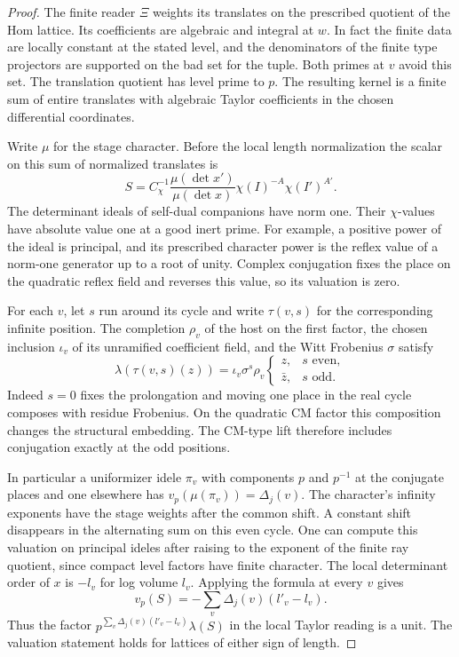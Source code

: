 \begin{proof}

The finite reader \(\Xi\) weights its translates on the prescribed
quotient of the Hom lattice. Its coefficients are algebraic and
integral at \(w\). In fact the finite data are locally constant at
the stated level, and the denominators of the finite type projectors
are supported on the bad set for the tuple. Both primes at \(v\)
avoid this set. The translation quotient has level prime to \(p\).
The resulting kernel is a finite sum of entire translates with
algebraic Taylor coefficients in the chosen differential coordinates.

Write \(\mu\) for the stage character. Before the local length
normalization the scalar on this sum of normalized translates is
\[
 S=C_\chi^{-1}\frac{\mu(\det x')}{\mu(\det x)}
                  \chi(I)^{-A}\chi(I')^{A'} .
 \tag{I1}\label{eq:tag-i1}
\]
The determinant ideals of self-dual companions have norm one.
Their \(\chi\)-values have absolute value one at a good inert
prime. For example, a positive power of the ideal is principal,
and its prescribed character power is the reflex value of a
norm-one generator up to a root of unity. Complex conjugation
fixes the place on the quadratic reflex field and reverses this
value, so its valuation is zero.


For each \(v\), let \(s\) run around its cycle and write
\(\tau(v,s)\) for the corresponding infinite position. The
completion \(\rho_v\) of the host on the first factor, the
chosen inclusion \(\iota_v\) of its unramified coefficient field,
and the Witt Frobenius \(\sigma\) satisfy
\[
 \lambda(\tau(v,s)(z))=
 \iota_v\sigma^s\rho_v
 \begin{cases} z,&s\text{ even},\\ \bar z,&s\text{ odd}.
 \end{cases}
 \tag{I2}\label{eq:tag-i2}
\]
Indeed \(s=0\) fixes the prolongation and moving one place in
the real cycle composes with residue Frobenius. On the quadratic
CM factor this composition changes the structural embedding.
The CM-type lift therefore includes conjugation exactly at the
odd positions.

In particular a uniformizer idele \(\pi_v\) with
components \(p\) and \(p^{-1}\) at the conjugate places and one
elsewhere has \(v_p(\mu(\pi_v))=\Delta_j(v)\). The character's
infinity exponents have the stage weights after the common shift.
A constant shift disappears in the alternating sum on this even
cycle. One can compute this valuation on principal ideles after
raising to the exponent of the finite ray quotient, since compact
level factors have finite character. The local determinant order
of \(x\) is \(-l_v\) for log volume \(l_v\). Applying the formula
at every \(v\) gives
\[
    v_p(S)=-\sum_v\Delta_j(v)(l'_v-l_v).
 \tag{I3}\label{eq:tag-i3}
\]
Thus the factor \(p^{\sum_v\Delta_j(v)(l'_v-l_v)}\lambda(S)\)
in the local Taylor reading is a unit. The valuation statement
holds for lattices of either sign of length.


\end{proof}

